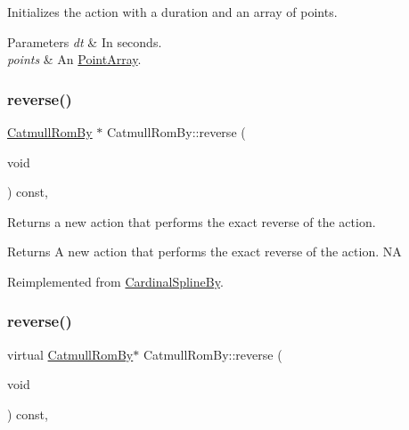 Initializes the action with a duration and an array of points.


\begin{DoxyParams}{Parameters}
{\em dt} & In seconds. \\
\hline
{\em points} & An \hyperlink{classPointArray}{Point\+Array}. \\
\hline
\end{DoxyParams}
\mbox{\label{classCatmullRomBy_a2f027f2c6627f98ffcc75a64ff6b0cd0}} 
\subsubsection{\texorpdfstring{reverse()}{reverse()}\hspace{0.1cm}{\footnotesize\ttfamily [1/2]}}
{\footnotesize\ttfamily \hyperlink{classCatmullRomBy}{Catmull\+Rom\+By} $\ast$ Catmull\+Rom\+By\+::reverse (\begin{DoxyParamCaption}\item[{void}]{ }\end{DoxyParamCaption}) const\hspace{0.3cm}{\ttfamily [override]}, {\ttfamily [virtual]}}

Returns a new action that performs the exact reverse of the action.

\begin{DoxyReturn}{Returns}
A new action that performs the exact reverse of the action.  NA 
\end{DoxyReturn}


Reimplemented from \hyperlink{classCardinalSplineBy_ac5084ddc681589404f2a26d52815344b}{Cardinal\+Spline\+By}.

\mbox{\label{classCatmullRomBy_ab489930d039c543d5965637ed50420d3}} 
\subsubsection{\texorpdfstring{reverse()}{reverse()}\hspace{0.1cm}{\footnotesize\ttfamily [2/2]}}
{\footnotesize\ttfamily virtual \hyperlink{classCatmullRomBy}{Catmull\+Rom\+By}$\ast$ Catmull\+Rom\+By\+::reverse (\begin{DoxyParamCaption}\item[{void}]{ }\end{DoxyParamCaption}) const\hspace{0.3cm}{\ttfamily [override]}, {\ttfamily [virtual]}}

